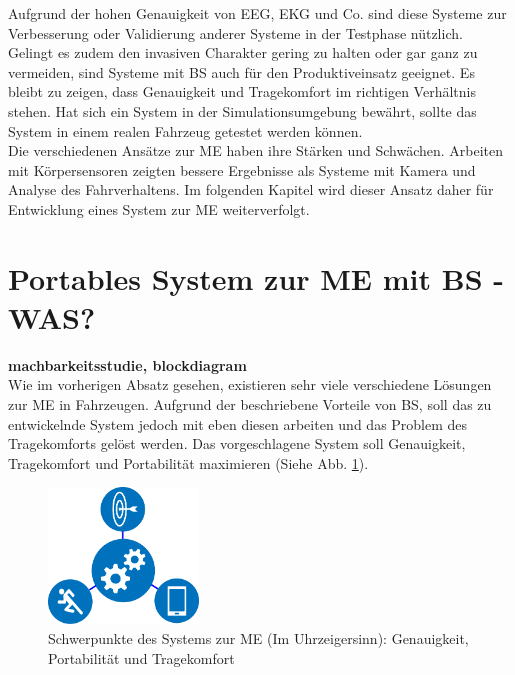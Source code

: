 {Aufgrund der hohen Genauigkeit von EEG, EKG und Co. sind diese Systeme zur Verbesserung oder Validierung anderer Systeme in der Testphase nützlich. Gelingt es zudem den invasiven Charakter gering zu halten oder gar ganz zu vermeiden, sind Systeme mit \acl{BS} auch für den Produktiveinsatz geeignet. Es bleibt zu zeigen, dass Genauigkeit und Tragekomfort im richtigen Verhältnis stehen. Hat sich ein System in der Simulationsumgebung bewährt, sollte das System in einem realen Fahrzeug getestet werden können.  \\

Die verschiedenen Ansätze zur \acl{ME} haben ihre Stärken und Schwächen. Arbeiten mit Körpersensoren zeigten bessere Ergebnisse als Systeme mit Kamera und Analyse des Fahrverhaltens. Im folgenden Kapitel wird dieser Ansatz daher für Entwicklung eines System zur \acl{ME} weiterverfolgt.

\section{Portables System zur \acl{ME} mit \acl{BS} - WAS?}
\label{chap:prop}
\textbf{machbarkeitsstudie, blockdiagram}\\
Wie im vorherigen Absatz gesehen, existieren sehr viele verschiedene Lösungen zur \acl{ME} in Fahrzeugen. Aufgrund der beschriebene Vorteile von \acl{BS}, soll das zu entwickelnde System jedoch mit eben diesen arbeiten und das Problem des Tragekomforts gelöst werden. Das vorgeschlagene System soll Genauigkeit, Tragekomfort und Portabilität maximieren (Siehe Abb. \ref{fig:emphasis}). \\

\begin{figure}[h] 
  \begin{center}
    \includegraphics[width=4cm]{img/all}
    \caption{Schwerpunkte des Systems zur \acl{ME} (Im Uhrzeigersinn): Genauigkeit, Portabilität und Tragekomfort}
    \label{fig:emphasis}
  \end{center}
\end{figure}

}
